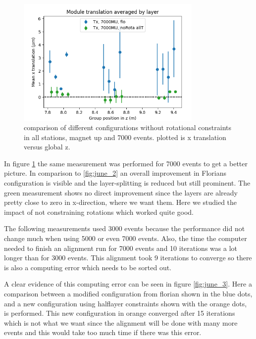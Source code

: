 \begin{figure}
  \centering
  \includegraphics[width=0.8\textwidth]{plots/june_21/Tx_noRota_allT_7000MU.png}
  \caption{comparison of different configurations without rotational constraints in all stations, magnet up and 7000 events. plotted is x translation versus global z.}
  \label{fig:june_2_1}
\end{figure}

In figure \ref{fig:june_2_1} the same measurement was performed for 7000 events to get a better picture. In comparison to \ref{fig:june_2} an overall improvement in Florians configuration is visible and the layer-splitting is reduced but still prominent. The green measurement shows no direct improvement since the layers are already pretty close to zero in x-direction, where we want them.
Here we studied the impact of not constraining rotations which worked quite good.

The following measurements used 3000 events because the performance did not change much when using 5000 or even 7000 events. Also, the time the computer needed to finish an alignment run for 7000 events and 10 iterations was a lot longer than for 3000 events.
This alignment took 9 iterations to converge so there is also a computing error
which needs to be sorted out.

A clear evidence of this computing error can be seen in figure \ref{fig:june_3}. Here a comparison between a modified configuration from florian shown in the blue dots, and a new configuration using halflayer constraints shown with the orange dots, is performed.
This new configuration in orange converged after 15 iterations which is not what we want since the alignment will be done with many more events and this would take too much time if there was this error.

